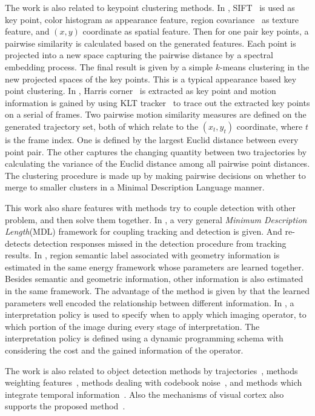 The work is also related to keypoint clustering methods. In \citep{mc}, SIFT~\citep{o12} is
used as key point, color histogram as appearance feature, region covariance~\citep{regionc}
as texture feature, and $(x,y)$ coordinate as spatial feature. Then
for one pair key points, a pairwise similarity is calculated based
on the generated features. Each point is projected into a new space
capturing the pairwise distance by a spectral embedding process. The
final result is given by a simple $k$-means clustering in the new
projected spaces of the key points. This is a typical
appearance based key point clustering. In \citep{my9}, Harris
corner~\citep{ij2} is extracted as key point and motion information is
gained by using KLT tracker~\citep{ij3} to trace out the extracted key
points on a serial of frames. Two pairwise motion similarity
measures are defined on the generated trajectory set, both of which
relate to the $(x_t,y_t)$ coordinate, where $t$ is the frame index.
One is defined by the largest Euclid distance between every point
pair. The other captures the changing quantity between two
trajectories by calculating the variance of the Euclid distance
among all pairwise point distances. The clustering procedure is made
up by making pairwise decisions on whether to merge to smaller
clusters in a Minimal Description Language manner.

This work also share features with methods try to couple detection with other problem, and then solve them together.
In \citep{my7}, a very general \emph{Minimum Description Length}(MDL) framework for
coupling tracking and detection is given. And \citep{ij10} re-detects
detection responses missed in the detection procedure from tracking results. In
\citep{ij14}, region semantic label associated with geometry
information is estimated in the same energy framework whose
parameters are learned together. Besides semantic and geometric information,
other information is also estimated in the same framework. The
advantage of the method is given by that the learned parameters well
encoded the relationship between different information. In
\citep{ij15},  a interpretation policy is used to specify when to
apply which imaging operator, to which portion of the image during
every stage of interpretation. The interpretation policy is defined
using a dynamic programming schema with considering the cost and the
gained information of the operator.

The work is also related to object detection methods by trajectories~\citep{my9,ac24}, methods weighting features~\citep{ij13}, methods dealing with codebook noise~\citep{ac19}, and methods which integrate temporal information~\citep{ac23}. Also the mechanisms of visual cortex also supports the proposed method~\citep{cfm}.


